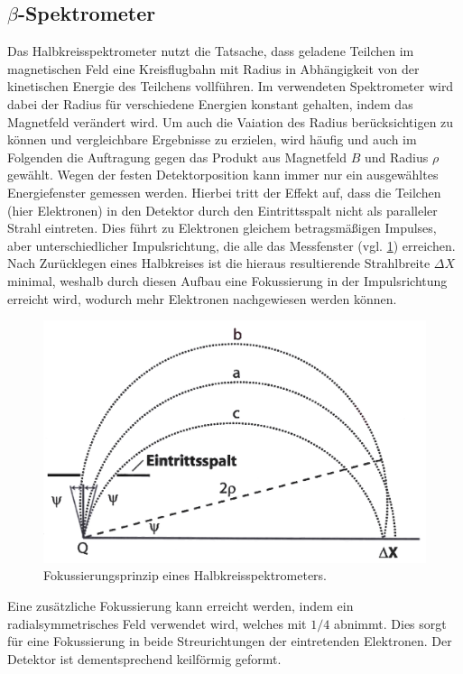 \documentclass[
	a4paper,
	12pt,
	pagesize,
	ngerman
]{scrartcl}
\begin{document}
	\subsection{$\beta$-Spektrometer}
	Das Halbkreisspektrometer nutzt die Tatsache, dass geladene Teilchen im magnetischen Feld eine Kreisflugbahn mit Radius in Abhängigkeit von der kinetischen Energie des Teilchens vollführen.
	Im verwendeten Spektrometer wird dabei der Radius für verschiedene Energien konstant gehalten, indem das Magnetfeld verändert wird.
	Um auch die Vaiation des Radius berücksichtigen zu können und vergleichbare Ergebnisse zu erzielen, wird häufig und auch im Folgenden die Auftragung gegen das Produkt aus Magnetfeld $B$ und Radius $\rho$ gewählt.
	Wegen der festen Detektorposition kann immer nur ein ausgewähltes Energiefenster gemessen werden.
	Hierbei tritt der Effekt auf, dass die Teilchen (hier Elektronen) in den Detektor durch den Eintrittsspalt nicht als paralleler Strahl eintreten.
	Dies führt zu Elektronen gleichem betragsmäßigen Impulses, aber unterschiedlicher Impulsrichtung, die alle das Messfenster (vgl. \cref{fig_Halbkreisspektrometer}) erreichen.
	Nach Zurücklegen eines Halbkreises ist die hieraus resultierende Strahlbreite $\Delta X$ minimal, weshalb durch diesen Aufbau eine Fokussierung in der Impulsrichtung erreicht wird, wodurch mehr Elektronen nachgewiesen werden können.

	\begin{figure}[H]
			\includegraphics[width= 0.6 \linewidth]{img/spektrometer_schema}
			\caption{
			Fokussierungsprinzip eines Halbkreisspektrometers.
			\cite{Anleitung}
			}
			\label{fig_Halbkreisspektrometer}
	\end{figure}

	Eine zusätzliche Fokussierung kann erreicht werden, indem ein radialsymmetrisches Feld verwendet wird, welches mit $1/4$ abnimmt.
	Dies sorgt für eine Fokussierung in beide Streurichtungen der eintretenden Elektronen.
	Der Detektor ist dementsprechend keilförmig geformt. %
\end{document}
